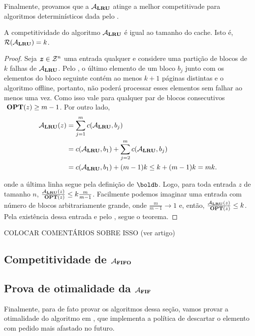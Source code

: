Finalmente, provamos que a \(\mathcal{A}_{\mathbf{LRU}}\) atinge a melhor competitivade para algoritmos determinísticos dada pelo .

\begin{theorem}
  A competitividade do algoritmo \(\mathcal{A}_{\mathbf{LRU}}\) é igual ao tamanho do cache. Isto é, \(\mathcal{R}({\mathcal{A}_{\mathbf{LRU}}}) = k\).
\end{theorem}

\begin{proof}
  Seja \(\bm{z} \in \mathcal{Z}^n\) uma entrada qualquer e considere uma partição de blocos de \(k\) falhas de \(\mathcal{A}_{\mathbf{LRU}}\). Pelo , o último elemento de um bloco \(b_j\) junto com os elementos do bloco seguinte contém ao menos \(k+1\) páginas distintas e o algoritmo offline, portanto, não poderá processar esses elementos sem falhar ao menos uma vez. Como isso vale para qualquer par de blocos consecutivos \(\ \textbf{OPT}(z) \ge m-1\). Por outro lado,
    \begin{align*}
    \mathcal{A}_{\mathbf{LRU}}(z) 
    &= \sum_{j=1}^m c(\mathcal{A}_{\mathbf{LRU}},b_j) 
    \\
    &= c(\mathcal{A}_{\mathbf{LRU}},b_1) + \sum_{j=2}^m c(\mathcal{A}_{\mathbf{LRU}},b_j)
    \\
    &= c(\mathcal{A}_{\mathbf{LRU}},b_1) + (m-1)k \le k + (m-1)k = mk.
    \end{align*}

    onde a última linha segue pela definição de \(\boldb\). Logo, para toda entrada \(z\) de tamanho \(n\), \(\frac{\mathcal{A}_{\mathbf{LRU}}(z)}{\ \textbf{OPT}(z)} \le k\frac{m}{m-1}\). Facilmente podemos imaginar uma entrada com número de blocos arbitrariamente grande, onde \(\frac{m}{m-1} \to 1\) e, então, \(\frac{\mathcal{A}_{\mathbf{LRU}}(z)}{\ \textbf{OPT}(z)} \le k\). Pela existência dessa entrada e pelo , segue o teorema.
\end{proof}

COLOCAR COMENTÁRIOS SOBRE ISSO (ver artigo)

\subsection{Competitividade de \(\mathcal{A}_{\mathbf{FIFO}}\)}

\subsection{Prova de otimalidade da \(\mathcal{A}_{\mathbf{FIF}}\)}

Finalmente, para de fato provar os algoritmos dessa seção, vamos provar a otimalidade do algoritmo em \textcite{Belady66}, que implementa a política de descartar o elemento com pedido mais afastado no futuro.


